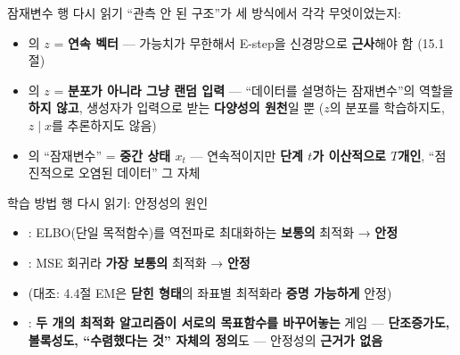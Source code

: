 \documentclass[aspectratio=169,11pt]{beamer}
\begin{document}
\begin{frame}{잠재변수 행 다시 읽기}
  ``관측 안 된 구조''가 세 방식에서 각각 무엇이었는지:
  \begin{itemize}
    \item {}의 $z$ = \textbf{연속 벡터} — 가능치가 무한해서
      E-step을 신경망으로 \textbf{근사}해야 함 (15.1절)
    \item {}의 $z$ = \textbf{분포가 아니라 그냥 랜덤 입력} —
      ``데이터를 설명하는 잠재변수''의 역할을 \textbf{하지 않고},
      생성자가 입력으로 받는 \textbf{다양성의 원천}일 뿐
      ($z$의 분포를 학습하지도, $z \mid x$를 추론하지도 않음)
    \item {}의 ``잠재변수'' = \textbf{중간 상태 $x_t$}
      — 연속적이지만 \textbf{단계 $t$가 이산적으로 $T$개인},
      ``점진적으로 오염된 데이터'' 그 자체
  \end{itemize}
\end{frame}

\begin{frame}{학습 방법 행 다시 읽기: 안정성의 원인}
  \begin{itemize}
    \item {}: ELBO(단일 목적함수)를 역전파로 최대화하는
      \textbf{보통의} 최적화 → \textbf{안정}
    \item {}: MSE 회귀라 \textbf{가장 보통의} 최적화 →
      \textbf{안정}
    \item (대조: 4.4절 EM은 \textbf{닫힌 형태}의 좌표별 최적화라
      \textbf{증명 가능하게} 안정)
    \item {}: \textbf{두 개의 최적화 알고리즘이 서로의
      목표함수를 바꾸어놓는} 게임 — \textbf{단조증가도, 볼록성도,
      ``수렴했다는 것'' 자체의 정의}도 — 안정성의 \textbf{근거가
      없음}
  \end{itemize}
\end{frame}

\end{document}
